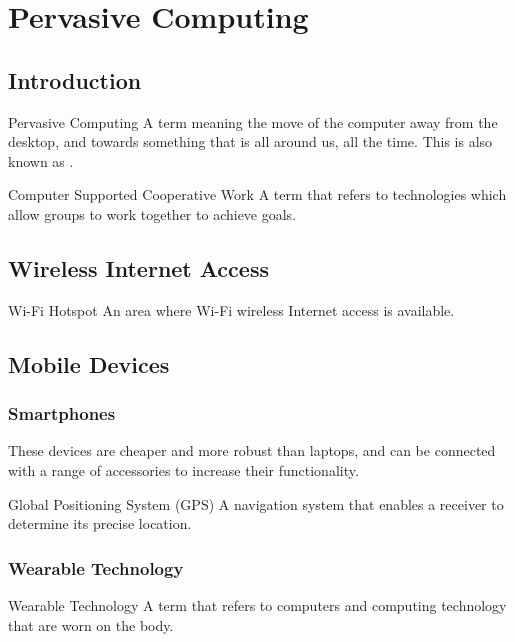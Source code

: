 \documentclass[\main/notes.tex]{subfiles}
\begin{document}
	\setcounter{chapter}{9}
	\chapter{Pervasive Computing}
		\section{Introduction}
			\begin{definition}{Pervasive Computing}
				A term meaning the move of the computer away from the desktop, and towards something that is all around us, all the time. This is also known as .
			\end{definition}
			\begin{definition}{Computer Supported Cooperative Work}
				A term that refers to technologies which allow groups to work together to achieve goals.
			\end{definition}

		\section{Wireless Internet Access}
			\begin{definition}{Wi-Fi Hotspot}
				An area where Wi-Fi wireless Internet access is available.
			\end{definition}

		\section{Mobile Devices}
			\subsection{Smartphones}
				These devices are cheaper and more robust than laptops, and can be connected with a range of accessories to increase their functionality.
				\begin{definition}{Global Positioning System (GPS)}
					A navigation system that enables a receiver to determine its precise location.
				\end{definition}
			\subsection{Wearable Technology}
				\begin{definition}{Wearable Technology}
					A term that refers to computers and computing technology that are worn on the body.
				\end{definition}
\end{document}

